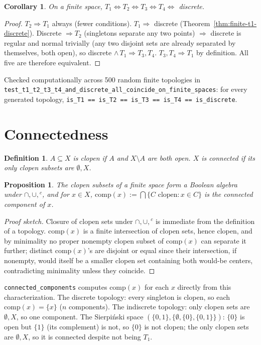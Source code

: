 \documentclass[11pt]{article}
\newtheorem{proposition}{Proposition}
\newtheorem{definition}{Definition}
\newtheorem{corollary}{Corollary}
\begin{document}
\begin{corollary}
\label{cor:all-coincide}
On a finite space, $T_1 \iff T_2 \iff T_3 \iff T_4 \iff$ discrete.
\end{corollary}
\begin{proof}
$T_2\Rightarrow T_1$ always (fewer conditions). $T_1\Rightarrow$ discrete
(Theorem~\ref{thm:finite-t1-discrete}). Discrete $\Rightarrow T_2$ (singletons separate any
two points) $\Rightarrow$ discrete is regular and normal trivially (any two disjoint sets
are already separated by themselves, both open), so discrete $\wedge\, T_1 \Rightarrow
T_3, T_4$. $T_3, T_4 \Rightarrow T_1$ by definition. All five are therefore equivalent.
\end{proof}

Checked computationally across 500 random finite topologies in
\texttt{test\_t1\_t2\_t3\_t4\_and\_discrete\_all\_coincide\_on\_finite\_spaces}: for every
generated topology, \texttt{is\_T1 == is\_T2 == is\_T3 == is\_T4 == is\_discrete}.

\section{Connectedness}

\begin{definition}
$A\subseteq X$ is \emph{clopen} if $A$ and $X\setminus A$ are both open. $X$ is
\emph{connected} if its only clopen subsets are $\emptyset, X$.
\end{definition}

\begin{proposition}
The clopen subsets of a finite space form a Boolean algebra under $\cap,\cup,{}^c$, and for
$x\in X$, $\mathrm{comp}(x) := \bigcap\{C \text{ clopen} : x\in C\}$ is the connected
component of $x$.
\end{proposition}
\begin{proof}[Proof sketch]
Closure of clopen sets under $\cap,\cup,{}^c$ is immediate from the definition of a
topology. $\mathrm{comp}(x)$ is a finite intersection of clopen sets, hence clopen, and by
minimality no proper nonempty clopen subset of $\mathrm{comp}(x)$ can separate it further;
distinct $\mathrm{comp}(x)$'s are disjoint or equal since their intersection, if nonempty,
would itself be a smaller clopen set containing both would-be centers, contradicting
minimality unless they coincide.
\end{proof}

\texttt{connected\_components} computes $\mathrm{comp}(x)$ for each $x$ directly from this
characterization. The discrete topology: every singleton is clopen, so each
$\mathrm{comp}(x)=\{x\}$ ($n$ components). The indiscrete topology: only clopen sets are
$\emptyset,X$, so one component. The Sierpi\'nski space $(\{0,1\},
\{\emptyset,\{0\},\{0,1\}\})$: $\{0\}$ is open but $\{1\}$ (its complement) is not, so
$\{0\}$ is not clopen; the only clopen sets are $\emptyset, X$, so it is connected despite
not being $T_1$.
\end{document}
